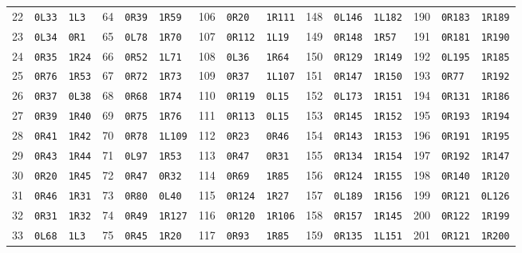 \begin{center}
\begin{tabular}{rll@{\qquad}rll@{\qquad}rll@{\qquad}rll@{\qquad}rll}
22 & \texttt{0L33} & \texttt{1L3} & 64 & \texttt{0R39} & \texttt{1R59} & 106 & \texttt{0R20} & \texttt{1R111} & 148 & \texttt{0L146} & \texttt{1L182} & 190 & \texttt{0R183} & \texttt{1R189} \\
23 & \texttt{0L34} & \texttt{0R1} & 65 & \texttt{0L78} & \texttt{1R70} & 107 & \texttt{0R112} & \texttt{1L19} & 149 & \texttt{0R148} & \texttt{1R57} & 191 & \texttt{0R181} & \texttt{1R190} \\
24 & \texttt{0R35} & \texttt{1R24} & 66 & \texttt{0R52} & \texttt{1L71} & 108 & \texttt{0L36} & \texttt{1R64} & 150 & \texttt{0R129} & \texttt{1R149} & 192 & \texttt{0L195} & \texttt{1R185} \\
25 & \texttt{0R76} & \texttt{1R53} & 67 & \texttt{0R72} & \texttt{1R73} & 109 & \texttt{0R37} & \texttt{1L107} & 151 & \texttt{0R147} & \texttt{1R150} & 193 & \texttt{0R77} & \texttt{1R192} \\
26 & \texttt{0R37} & \texttt{0L38} & 68 & \texttt{0R68} & \texttt{1R74} & 110 & \texttt{0R119} & \texttt{0L15} & 152 & \texttt{0L173} & \texttt{1R151} & 194 & \texttt{0R131} & \texttt{1R186} \\
27 & \texttt{0R39} & \texttt{1R40} & 69 & \texttt{0R75} & \texttt{1R76} & 111 & \texttt{0R113} & \texttt{0L15} & 153 & \texttt{0R145} & \texttt{1R152} & 195 & \texttt{0R193} & \texttt{1R194} \\
28 & \texttt{0R41} & \texttt{1R42} & 70 & \texttt{0R78} & \texttt{1L109} & 112 & \texttt{0R23} & \texttt{0R46} & 154 & \texttt{0R143} & \texttt{1R153} & 196 & \texttt{0R191} & \texttt{1R195} \\
29 & \texttt{0R43} & \texttt{1R44} & 71 & \texttt{0L97} & \texttt{1R53} & 113 & \texttt{0R47} & \texttt{0R31} & 155 & \texttt{0R134} & \texttt{1R154} & 197 & \texttt{0R192} & \texttt{1R147} \\
30 & \texttt{0R20} & \texttt{1R45} & 72 & \texttt{0R47} & \texttt{0R32} & 114 & \texttt{0R69} & \texttt{1R85} & 156 & \texttt{0R124} & \texttt{1R155} & 198 & \texttt{0R140} & \texttt{1R120} \\
31 & \texttt{0R46} & \texttt{1R31} & 73 & \texttt{0R80} & \texttt{0L40} & 115 & \texttt{0R124} & \texttt{1R27} & 157 & \texttt{0L189} & \texttt{1R156} & 199 & \texttt{0R121} & \texttt{0L126} \\
32 & \texttt{0R31} & \texttt{1R32} & 74 & \texttt{0R49} & \texttt{1R127} & 116 & \texttt{0R120} & \texttt{1R106} & 158 & \texttt{0R157} & \texttt{1R145} & 200 & \texttt{0R122} & \texttt{1R199} \\
33 & \texttt{0L68} & \texttt{1L3} & 75 & \texttt{0R45} & \texttt{1R20} & 117 & \texttt{0R93} & \texttt{1R85} & 159 & \texttt{0R135} & \texttt{1L151} & 201 & \texttt{0R121} & \texttt{1R200} \\

\end{tabular}
\end{center}
